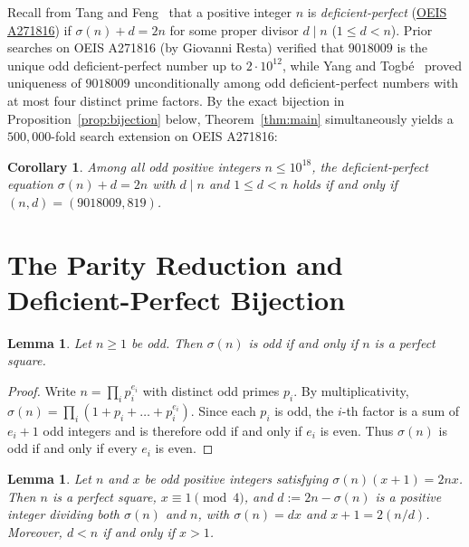 \documentclass[11pt]{amsart}
\newtheorem{lemma}[theorem]{Lemma}
\newtheorem{corollary}[theorem]{Corollary}
\theoremstyle{definition}
\theoremstyle{remark}
\begin{document}
Recall from Tang and Feng~\cite{TangFeng2014} that a positive integer $n$ is \emph{deficient-perfect} (\href{https://oeis.org/A271816}{OEIS A271816}) if $\sigma(n) + d = 2n$ for some proper divisor $d \mid n$ ($1 \le d < n$). Prior searches on OEIS A271816 (by Giovanni Resta) verified that $9018009$ is the unique odd deficient-perfect number up to $2 \cdot 10^{12}$, while Yang and Togb\'e~\cite{YangTogbe2023} proved uniqueness of $9018009$ unconditionally among odd deficient-perfect numbers with at most four distinct prime factors. By the exact bijection in Proposition~\ref{prop:bijection} below, Theorem~\ref{thm:main} simultaneously yields a $500{,}000$-fold search extension on OEIS A271816:

\begin{corollary}\label{cor:deficient}
Among all odd positive integers $n \le 10^{18}$, the deficient-perfect equation $\sigma(n) + d = 2n$ with $d \mid n$ and $1 \le d < n$ holds if and only if $(n, d) = (9018009, 819)$.
\end{corollary}

\section{The Parity Reduction and Deficient-Perfect Bijection}

\begin{lemma}\label{lem:odd-sigma}
Let $n \ge 1$ be odd. Then $\sigma(n)$ is odd if and only if $n$ is a perfect square.
\end{lemma}

\begin{proof}
Write $n = \prod_i p_i^{e_i}$ with distinct odd primes $p_i$. By multiplicativity, $\sigma(n) = \prod_i (1 + p_i + \dots + p_i^{e_i})$. Since each $p_i$ is odd, the $i$-th factor is a sum of $e_i + 1$ odd integers and is therefore odd if and only if $e_i$ is even. Thus $\sigma(n)$ is odd if and only if every $e_i$ is even.
\end{proof}

\begin{lemma}\label{lem:structure}
Let $n$ and $x$ be odd positive integers satisfying $\sigma(n)(x + 1) = 2nx$. Then $n$ is a perfect square, $x \equiv 1 \pmod 4$, and $d := 2n - \sigma(n)$ is a positive integer dividing both $\sigma(n)$ and $n$, with $\sigma(n) = dx$ and $x + 1 = 2(n/d)$. Moreover, $d < n$ if and only if $x > 1$.
\end{lemma}
\end{document}
